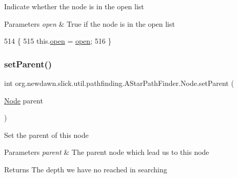Indicate whether the node is in the open list


\begin{DoxyParams}{Parameters}
{\em open} & True if the node is in the open list \\
\hline
\end{DoxyParams}

\begin{DoxyCode}
514                                           \{
515             this.\mbox{\hyperlink{classorg_1_1newdawn_1_1slick_1_1util_1_1pathfinding_1_1_a_star_path_finder_1_1_node_abf28b5b61c313f5280b25d395d408c57}{open}} = \mbox{\hyperlink{classorg_1_1newdawn_1_1slick_1_1util_1_1pathfinding_1_1_a_star_path_finder_1_1_node_abf28b5b61c313f5280b25d395d408c57}{open}};
516         \}
\end{DoxyCode}
\mbox{\label{classorg_1_1newdawn_1_1slick_1_1util_1_1pathfinding_1_1_a_star_path_finder_1_1_node_a101aeb2b6fb3a2835e530085e185e504}} 
\subsubsection{\texorpdfstring{set\+Parent()}{setParent()}}
{\footnotesize\ttfamily int org.\+newdawn.\+slick.\+util.\+pathfinding.\+A\+Star\+Path\+Finder.\+Node.\+set\+Parent (\begin{DoxyParamCaption}\item[{\mbox{\hyperlink{classorg_1_1newdawn_1_1slick_1_1util_1_1pathfinding_1_1_a_star_path_finder_1_1_node}{Node}}}]{parent }\end{DoxyParamCaption})\hspace{0.3cm}{\ttfamily [inline]}}

Set the parent of this node


\begin{DoxyParams}{Parameters}
{\em parent} & The parent node which lead us to this node \\
\hline
\end{DoxyParams}
\begin{DoxyReturn}{Returns}
The depth we have no reached in searching 
\end{DoxyReturn}

